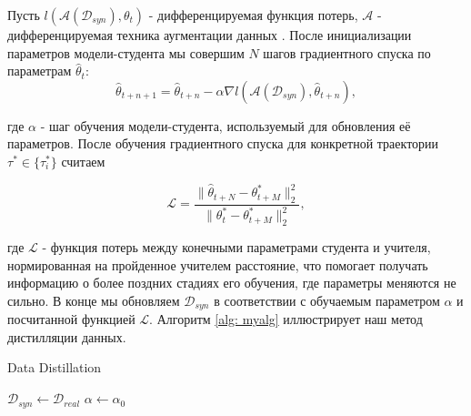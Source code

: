 \documentclass[12pt]{article}
\begin{document}
Пусть $l(\mathcal{A}(\mathcal{D}_{syn}), \theta_t)$ - дифференцируемая функция потерь, $\mathcal{A}$ - дифференцируемая техника аугментации данных \cite{romero2014fitnets}. После инициализации параметров модели-студента мы совершим $N$ шагов градиентного спуска по параметрам $\hat\theta_t$:
\begin{equation}\label{eq1}
    \hat\theta_{t+n+1} = \hat\theta_{t+n} - \alpha\nabla l(\mathcal{A}(\mathcal{D}_{syn}), \hat\theta_{t+n}),    
\end{equation}

где $\alpha$ - шаг обучения модели-студента, используемый для обновления её параметров. 
После обучения градиентного спуска для конкретной траектории $\tau^* \in \{\tau_i^*\}$ считаем 

\begin{equation}\label{eq2}
    \mathcal{L} = \frac{\parallel\hat\theta_{t+N}-\theta_{t+M}^*\parallel_2^2}{\parallel\theta_t^* - \theta_{t+M}^* \parallel_2^2},   
\end{equation}

где $\mathcal{L}$ - функция потерь между конечными параметрами студента и учителя, нормированная на пройденное учителем расстояние, что помогает получать информацию о более поздних стадиях его обучения, где параметры меняются не сильно. В конце мы обновляем $\mathcal{D}_{syn}$ в соответствии с обучаемым параметром $\alpha$ и посчитанной функцией $\mathcal{L}$. Алгоритм \ref{alg: myalg} иллюстрирует наш метод дистилляции данных.

{}
\begin{algorithm}[hbt!]
\caption{Data Distillation}\label{alg:two}
$\mathcal{D}_{syn} \gets \mathcal{D}_{real}$\;
$\alpha \gets \alpha_0$\;
  \label{alg: myalg}
\end{algorithm}
\end{document}
